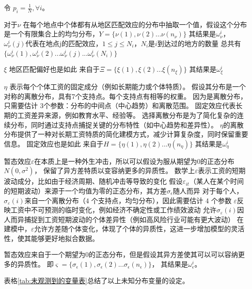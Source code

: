 \documentclass[a4paper,12pt,oneside]{book} %
\begin{document}
令 $p_i = \frac{1}{N}, \forall i$。


对于$\nu$
在每个地点中个体都有从地区匹配效应的分布中抽取一个值，假设这个分布是一个有限集合上的均匀分布，$Y=\{\nu(1),\nu(2)...\nu(n_{\nu})\}$
其结果是$\omega^{i}_{\nu}$，$\omega^{i}_{\nu}(j)$代表在地点j的匹配效应，$1\leqslant j\leqslant N_i$，$N_i$是$i$到达过的地方的数量
总共有$\{\omega^{i}_{\nu}(1),\omega^{i}_{\nu}(2)...\omega^{i}_{\nu}(j)...\omega^{i}_{\nu}(N_i)\}$

$\xi$
地区匹配偏好也是如此
来自于$\Xi=\{\xi(1),\xi(2)...\xi(n_{\xi})\}$
其结果是$\omega^{i}_{\xi}$

$\eta$ 表示每个个体工资的固定成分（例如长期能力或个体特质）。
假设其分布是一个对称的离散分布，具有7个支持点。每个支持点有相等的权重。
因为是离散分布，只需要估计 3个参数：分布的中间点（中心趋势）和离散范围。
固定效应代表长期的工资差异来源，例如教育水平、经验等。
选择离散分布是为了简化复杂的连续分布，同时通过支持点捕捉关键的分布特性（如中心趋势和差异性）。
$\eta$的离散分布提供了一种对长期工资特质的简化建模方式，减少计算复杂度，同时保留重要信息。
固定效应也是如此
来自于$H=\{\eta(1),\eta(2)...\eta(n_\eta)\}$
其结果是$\omega^{i}_{\eta}$


暂态效应$\varepsilon$在本质上是一种外生冲击，所以可以假设为服从期望为$0$的正态分布$N(0,\sigma^2)$，
保留了异方差特质以变容纳更多的异质性。
数学上$\varepsilon$表示工资的短期波动成分，比如由于经济周期、随机冲击等导致的变化
假设$\varepsilon_{it}$（某人在某个时间的短期波动）来源于一个均值为零的正态分布，其方差$\sigma_{\epsilon}$随人而异
对于每个人，$\sigma_\varepsilon(i)$来自一个离散分布（4 个支持点，均匀分布），因此需要估计 4 个参数
$\varepsilon$反映工资中不可预测的临时变化，例如经济不确定性或工作绩效波动
允许$\sigma_\varepsilon(i)$因人而异捕捉到工资短期波动的个体差异性（例如高风险行业可能有更大波动）
在建模中，$\varepsilon$允许方差随个体变化，体现了个体的异质性，这进一步增加模型的灵活性，使其能够更好地拟合数据。

暂态效应来自于一个期望为$0$的正态分布，但是假设其异方差使其可以可以容纳更多的异质性。
即$\varsigma=\{\sigma_{\epsilon}(1),\sigma_{\epsilon}(2)...\sigma_{\epsilon}(n_{\epsilon})\}$，
其结果是$\omega^{i}_{\epsilon}$。




表格\ref{tab:未观测到的变量表}总结了以上未知分布变量的设定。
\end{document}
